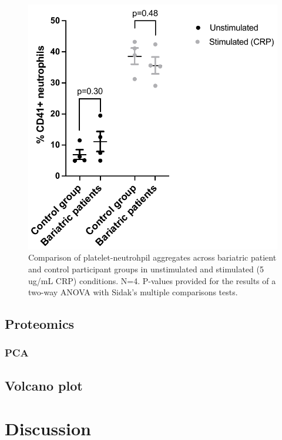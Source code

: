 \documentclass[11pt,twoside]{bristolthesis}
\begin{document}
\begin{figure}
\includegraphics{figure/Bariatric_study/Plt-neu_aggregates} \caption[Comparison of platelet-neutrophil aggregates]{Comparison of platelet-neutrohpil aggregates across bariatric patient and control participant groups in unstimulated and stimulated (5 ug/mL CRP) conditions. N=4. P-values provided for the results of a two-way ANOVA with Sidak's multiple comparisons tests.}\label{fig:platelet-neutrophil}
\end{figure}
\hypertarget{proteomics}{%
\subsection{Proteomics}\label{proteomics}}

\hypertarget{pca}{%
\subsubsection{PCA}\label{pca}}

\hypertarget{volcano-plot}{%
\subsection{Volcano plot}\label{volcano-plot}}

\hypertarget{discussion-1}{%
\section{Discussion}\label{discussion-1}}
\end{document}

